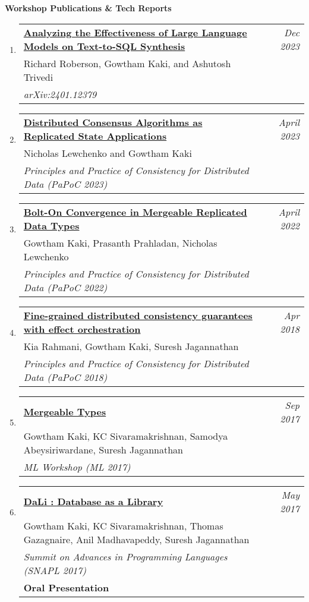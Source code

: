 \documentclass[10pt]{article}
\makeatletter
\newcommand{\lbar}[1]{{\color{#1}\ding{118}}\hspace*{2pt}}
\newenvironment{benumerate}[2]{
    \let\oldItem\item
    \def\item{\addtocounter{enumi}{-2}\oldItem}
    \begin{enumerate}[#2] \itemsep3pt
    \setcounter{enumi}{#1}
    \addtocounter{enumi}{1}} 
  {\end{enumerate}}
\newenvironment{publication}[5]
{ \item
  \begin{tabular*}{7.5in}{p{6.3in}@{\extracolsep{\fill}}r}
    \href{#1}{\textbf{#2}} & \textit{#3}\\ #4 &\\ \textit{#5}&\\
  \end{tabular*}
} {}
\newenvironment{publicationNote}[6]
{ \item
  \begin{tabular*}{7.5in}{p{6.3in}@{\extracolsep{\fill}}r}
    \href{#1}{\textbf{#2}} & \textit{#3}\\ #4 &\\ \textit{#5}\\ \textbf{#6} \\
  \end{tabular*}
} {}
\newenvironment{region}[3]{%
  \vspace*{0.5ex}
  {{\textbf{\large{#1}}}}
  \begin{benumerate}{#3}{\color{RoyalBlue}#2}}
  {\end{benumerate}\vspace{0.8ex}}
\makeatother
\begin{document}
\begin{region} {\lbar{Mahogany}Workshop Publications \& Tech Reports}{{W}1}{5}

  \begin{publication} {https://arxiv.org/abs/2401.12379}
    {Analyzing the Effectiveness of Large Language Models on
    Text-to-SQL Synthesis}
    {Dec 2023} {Richard Roberson, Gowtham Kaki, and Ashutosh Trivedi}
    {arXiv:2401.12379}
  \end{publication}

  \begin{publication} {https://gowthamk.github.io/docs/papoc22.pdf}
		{Distributed Consensus Algorithms as Replicated State Applications }
		{April 2023} {Nicholas Lewchenko and Gowtham Kaki}
		{Principles and Practice of Consistency for Distributed Data
    (PaPoC 2023)}
  \end{publication}

  \begin{publication} {https://gowthamk.github.io/docs/papoc23.pdf}
		{Bolt-On Convergence in Mergeable Replicated Data Types}
		{April 2022} {Gowtham Kaki, Prasanth Prahladan, Nicholas Lewchenko}
		{Principles and Practice of Consistency for Distributed Data
    (PaPoC 2022)}
  \end{publication}

	\begin{publication}{https://gowthamk.github.io/docs/papoc18.pdf}
		{Fine-grained distributed consistency guarantees with effect orchestration}
		{Apr 2018}{Kia Rahmani, Gowtham Kaki, Suresh Jagannathan}
    {Principles and Practice of Consistency for Distributed Data (PaPoC 2018)}
  \end{publication}

  \begin{publication}{http://kcsrk.info/papers/mergeable_types_ml17.pdf}
    {Mergeable Types}
    {Sep 2017}{Gowtham Kaki, KC Sivaramakrishnan, Samodya Abeysiriwardane, Suresh Jagannathan}
    {ML Workshop (ML 2017)}
  \end{publication}

	\begin{publicationNote} {http://kcsrk.info/papers/dali_snapl17.pdf}
    {DaLi : Database as a Library}
    {May 2017} {Gowtham Kaki, KC Sivaramakrishnan, Thomas Gazagnaire, Anil Madhavapeddy, Suresh Jagannathan}
    {Summit on Advances in Programming Languages (SNAPL 2017)}
    {Oral Presentation}
  \end{publicationNote}


\end{region}
\end{document}
